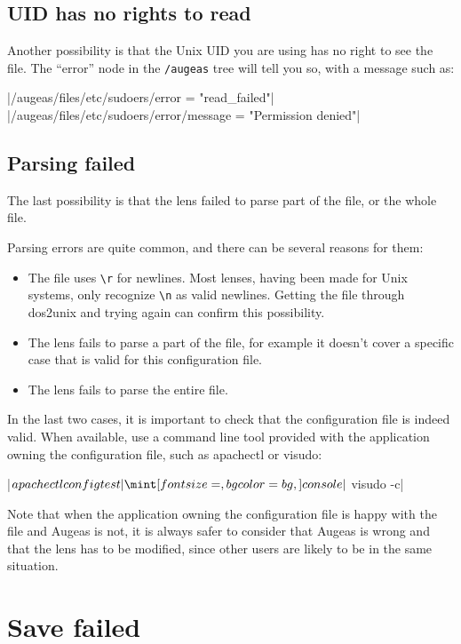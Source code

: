 \subsection{UID has no rights to read}

Another possibility is that the Unix UID you are using has no right to see the file. The ``error'' node in the \nolinkurl{/augeas} tree will tell you so, with a message such as:


\augtoolshcode|/augeas/files/etc/sudoers/error = "read_failed"|
\augtoolshcode|/augeas/files/etc/sudoers/error/message = "Permission denied"|

\subsection{Parsing failed}

The last possibility is that the lens failed to parse part of the file, or the whole file.

Parsing errors are quite common, and there can be several reasons for them:

\begin{itemize}
\item
  The file uses \verb!\r! for newlines. Most lenses, having been made for Unix systems, only recognize \verb!\n! as valid newlines. Getting the file through dos2unix and trying again can confirm this possibility.
\item
  The lens fails to parse a part of the file, for example it doesn't cover a specific case that is valid for this configuration file.
\item
  The lens fails to parse the entire file.
\end{itemize}
In the last two cases, it is important to check that the configuration file is indeed valid. When available, use a command line tool provided with the application owning the configuration file, such as apachectl or visudo:

\consolecode|$ apachectl configtest|
\consolecode|$ visudo -c|

Note that when the application owning the configuration file is happy with the file and Augeas is not, it is always safer to consider that Augeas is wrong and that the lens has to be modified, since other users are likely to be in the same situation.

\section{Save failed}

